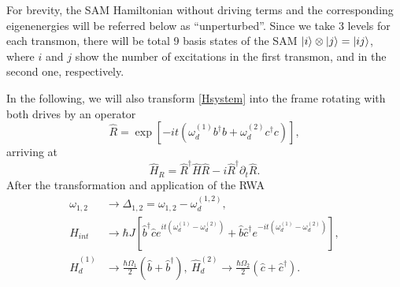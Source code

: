 \documentclass[%
 aps, prx,
 amsmath,amssymb,
 reprint,%
superscriptaddress
]{revtex4-2}
\begin{document}
For brevity, the SAM Hamiltonian without driving 
terms and the corresponding eigenenergies will be 
referred below as ``unperturbed''. Since we take 
3 levels for each transmon, there will be total 9 
basis states of the SAM $\ket{i}\otimes \ket{j} = 
\ket{ij}$, where $i$ and $j$ show the number of 
excitations in the first transmon, and in the 
second one, respectively.


In the following, we will also transform 
\autoref{Hsystem} into the frame rotating with 
both drives by an operator
\begin{equation}
\hat R = \exp[-i t (\omega_d^{(1)}
b^{\dagger}b+\omega_d^{(2)} 
c^{\dagger}c)],\label{eq:R}
\end{equation}
arriving at
\begin{equation}
\hat H_R = \hat R^{\dagger}\hat H \hat R -	 
{i}\hat R^{\dagger}\partial_t \hat 
R.\label{eq:rotation}
\end{equation}
After the transformation and application of the RWA
\begin{equation}
\begin{aligned}
	\omega_{1,2} &\rightarrow \Delta_{1,2} = \omega_{1,2} - \omega_d^{(1,2)},\\
	\hat H_{int} &\rightarrow \hbar J \left[\hat 
	b^\dag \hat c e^{it(\omega_d^{(1)} - \omega_d^{(2)})} 
	+ \hat b \hat c^\dag e^{-it(\omega_d^{(1)} - 
	\omega_d^{(2)})}\right],\\
	\hat H_{d}^{(1)} &\rightarrow \frac{\hbar \Omega_1}{2}(\hat b  + \hat b^\dag),\ 	\hat H_{d}^{(2)} \rightarrow \frac{\hbar \Omega_2}{2}(\hat c  + \hat c^\dag).
\end{aligned}
\label{eq:RWA}
\end{equation}
\end{document}
